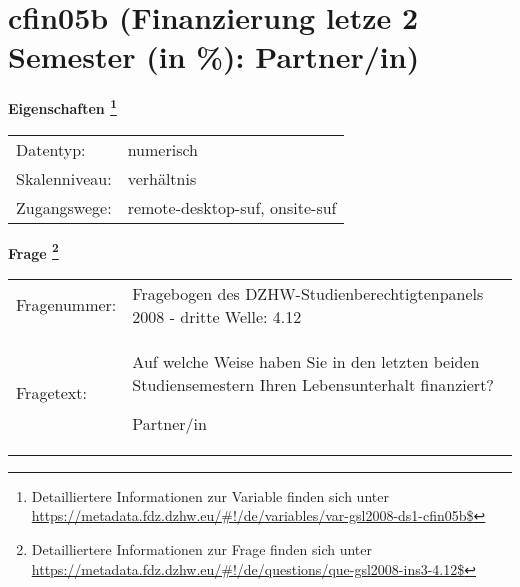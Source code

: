 
    \setcounter{footnote}{0}

    \vspace*{-1.8cm}
	\section{cfin05b (Finanzierung letze 2 Semester (in \%): Partner/in)}
	\label{section:cfin05b}



    \vspace*{0.5cm}
    \noindent\textbf{Eigenschaften
	\footnote{Detailliertere Informationen zur Variable finden sich unter
		\url{https://metadata.fdz.dzhw.eu/\#!/de/variables/var-gsl2008-ds1-cfin05b$}}}\\
	\begin{tabularx}{\hsize}{@{}lX}
	Datentyp: & numerisch \\
	Skalenniveau: & verhältnis \\
	Zugangswege: &
	  remote-desktop-suf, 
	  onsite-suf
 \\
    \end{tabularx}



				\vspace*{0.5cm}
                \noindent\textbf{Frage
	                \footnote{Detailliertere Informationen zur Frage finden sich unter
		              \url{https://metadata.fdz.dzhw.eu/\#!/de/questions/que-gsl2008-ins3-4.12$}}}\\
				\begin{tabularx}{\hsize}{@{}lX}
					Fragenummer: &
					  Fragebogen des DZHW-Studienberechtigtenpanels 2008 - dritte Welle:
					  4.12
 \\
					Fragetext: & Auf welche Weise haben Sie in den letzten beiden Studiensemestern Ihren Lebensunterhalt finanziert?\par  Partner/in \\
				\end{tabularx}






